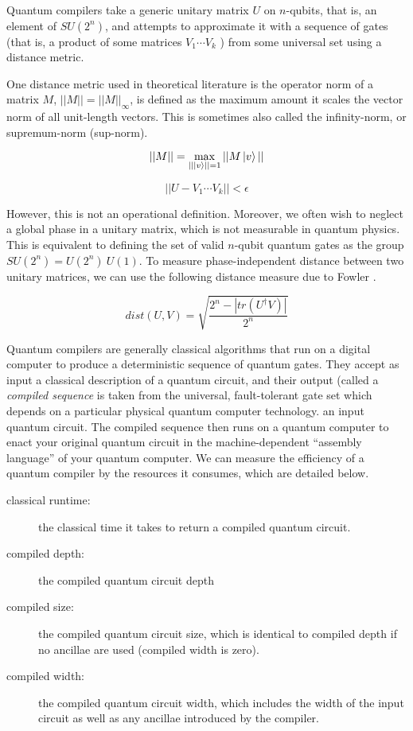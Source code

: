 Quantum compilers take a
generic unitary matrix $U$ on $n$-qubits, that is, an element of $SU(2^n)$, and
attempts to approximate it with a sequence of gates
(that is, a product of some matrices $V_1\cdots V_k$ )
from some universal set using a distance metric.

One distance metric used in theoretical literature
is the operator norm of a matrix $M$, $|| M || = || M ||_{\infty}$,
is defined as the maximum amount it scales the vector norm
of all unit-length vectors. This is sometimes also called the
infinity-norm, or supremum-norm (sup-norm).

\begin{equation}
|| M || = \max_{|| \left\vert{v}\right\rangle || = 1} || M \left\vert{v}\right\rangle ||
\end{equation}

\begin{equation}
|| U - V_1\cdots V_k || < \epsilon
\end{equation}

However, this is not an operational definition.
Moreover, we often wish to neglect a global phase in a unitary matrix,
which is not measurable in quantum physics. This is equivalent to
defining the set of valid $n$-qubit quantum gates as the
group $SU(2^n) = U(2^n) \ U(1)$. To measure phase-independent
distance between two unitary matrices, we can use the following
distance measure due to Fowler \cite{Fowler2011}.

\begin{equation}
dist(U, V) = \sqrt{\frac{2^n - |tr(U^{\dag}V)|}{2^n}}
\end{equation}

Quantum compilers are generally classical algorithms that run on a
digital computer to produce a deterministic sequence of quantum gates.
They accept as
input a classical description of a quantum circuit, and their output
(called a \emph{compiled sequence} is
taken from 
the universal, fault-tolerant gate set which depends on a particular
physical quantum computer technology.
an input quantum circuit. The compiled sequence then runs on a quantum
computer to enact your original quantum circuit in the machine-dependent
``assembly language'' of your quantum computer. We can measure the
efficiency of a quantum compiler by the resources it consumes, which are
detailed below.

\begin{description}
\item[classical runtime:] the classical time it takes to return a 
compiled quantum circuit.
\item[compiled depth:] the compiled quantum circuit depth
\item[compiled size:] the compiled quantum circuit size, which is
identical to compiled depth if no ancillae are used (compiled width is zero).
\item[compiled width:] the compiled quantum circuit width, which includes
the width of the input circuit as well as any ancillae introduced by
the compiler.
\end{description}

